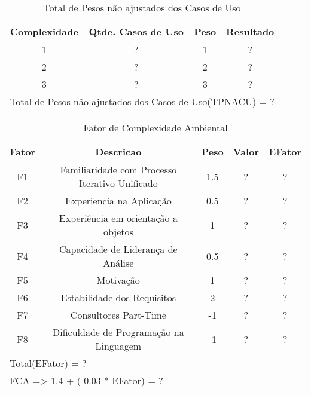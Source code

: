 \begin{table}[!htb]
	\caption[TPNACU]{Total de Pesos não ajustados dos Casos de Uso}
	\label{tab:correlacao}
	\centering
	\begin{tabular}{c|c|c|c}
		Complexidade & Qtde. Casos de Uso & Peso & Resultado   \\ \hline
		1 					 &  				?					&	1		 &	  ? 			 \\
		2 					 &  				?					&	2		 &	  ? 			 \\
		3 					 &  				?					&	3		 &	  ? 			 \\ \hline
		\multicolumn{4}{l}{Total de Pesos não ajustados dos Casos de Uso(TPNACU) = ?}\\
	\end{tabular}
\end{table}

\begin{table}[!htb]
\caption[FCA]{Fator de Complexidade Ambiental}
	\label{tab:correlacao}
	\centering
	\begin{tabular}{c|c|c|c|c}
		Fator 			 & Descricao 																			& Peso & Valor & EFator   \\ \hline
		F1					 & Familiaridade com Processo Iterativo Unificado &	1.5  &	  ?  &		?		  \\
		F2					 & Experiencia na Aplicação												&	0.5	 &	  ?  &		? 	 	\\
		F3 					 & Experiência em orientação a objetos						&	1		 &	  ?  &		? 		\\
		F4 					 & Capacidade de Liderança de Análise							&	0.5	 &	  ?  &		? 		\\
		F5 					 & Motivação																			&	1		 &	  ?  &		? 		\\
		F6 					 & Estabilidade dos Requisitos										&	2		 &	  ?  &		? 		\\
		F7 					 & Consultores Part-Time													&	-1	 &	  ?  &		? 		\\
		F8 					 & Dificuldade de Programação na Linguagem				&	-1	 &	  ?  &		? 		\\ \hline
		\multicolumn{5}{l}{Total(EFator) = ?}\\ \hline
		\multicolumn{5}{l}{FCA => 1.4 + (-0.03 * EFator) = ?}\\
	\end{tabular}
\end{table}


